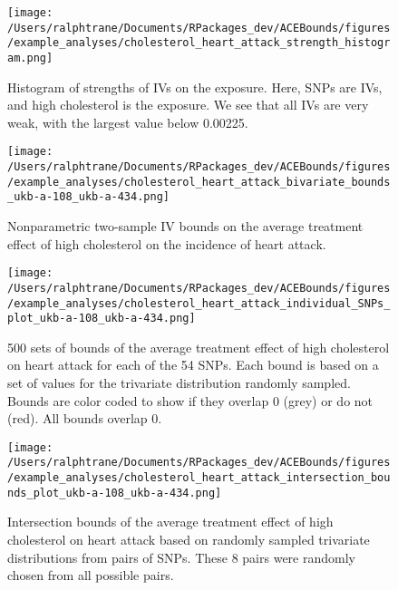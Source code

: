 \documentclass[
]{article}
\theoremstyle{plain}
\begin{document}
\begin{figure}[H]
 \center
 \texttt{[image: /Users/ralphtrane/Documents/RPackages\_dev/ACEBounds/figures/example\_analyses/cholesterol\_heart\_attack\_strength\_histogram.png]}
 \caption{Histogram of strengths of IVs on the exposure. Here, SNPs are IVs, and high cholesterol is the exposure. We see that all IVs are very weak, with the largest value below 0.00225.}
 \label{fig:cholesterol_heart_attack_strength_histogram}
\end{figure}

\begin{figure}[H]
  \texttt{[image: /Users/ralphtrane/Documents/RPackages\_dev/ACEBounds/figures/example\_analyses/cholesterol\_heart\_attack\_bivariate\_bounds\_ukb-a-108\_ukb-a-434.png]}
  \caption{Nonparametric two-sample IV bounds on the average treatment effect of high cholesterol on the incidence of heart attack.}
  \label{fig:cholesterol_on_heart_attack_ind_bounds}
\end{figure}

\begin{figure}[H]
  \center
  \texttt{[image: /Users/ralphtrane/Documents/RPackages\_dev/ACEBounds/figures/example\_analyses/cholesterol\_heart\_attack\_individual\_SNPs\_plot\_ukb-a-108\_ukb-a-434.png]}
    \caption{500 sets of bounds of the average treatment effect of high cholesterol on heart attack for each of the 54 SNPs. Each bound is based on a set of values for the trivariate distribution randomly sampled. Bounds are color coded to show if they overlap 0 (grey) or do not (red). All bounds overlap 0.}
    \label{fig:cholesterol_heart_attack_tri_bounds_all}
\end{figure}

\begin{figure}[H]
  \center
  \texttt{[image: /Users/ralphtrane/Documents/RPackages\_dev/ACEBounds/figures/example\_analyses/cholesterol\_heart\_attack\_intersection\_bounds\_plot\_ukb-a-108\_ukb-a-434.png]}
  \caption{Intersection bounds of the average treatment effect of high cholesterol on heart attack based on randomly sampled trivariate distributions from pairs of SNPs. These 8 pairs were randomly chosen from all possible pairs.}
  \label{fig:cholesterol_on_heart_attack_intersections}
\end{figure}

\printbibliography[title=References]
\end{document}
